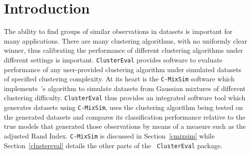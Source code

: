 \documentclass[twoside,11pt]{article}
\begin{document}
\section{Introduction}
The ability to find groups of similar observations in datasets is  
important for many applications.
There are many clustering algorithms, with no uniformly clear winner, 
thus calibrating the performance of different
clustering algorithms under different settings is important.
{\tt ClusterEval} provides software to evaluate performance of any
user-provided clustering algorithm under simulated datasets of specified
clustering complexity. At its heart is the {\tt C-MixSim} software
which implements~\citet{maitraandmelnykov09}'s algorithm to simulate
datasets from Gaussian mixtures of different clustering difficulty.
{\tt ClusterEval} thus provides an integrated software tool which
generates datasets using {\tt C-MixSim}, uses the clustering algorithm
being tested on the generated datasets and compares its classification
performance relative to the true models that generated those
observations by means of a measure such as the adjusted Rand
Index. {\tt C-MixSim} is discussed in Section~\ref{cmixsim} while
Section~\ref{clustereval} details the other parts of the {\tt
  ClusterEval} package. 
\end{document}
